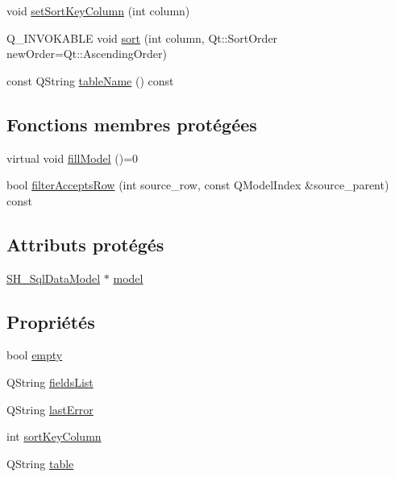 \begin{DoxyCompactItemize}
\item 
void \hyperlink{classSimpleHotel_1_1SH__ExtendedProxyModel_a901f2d931216126e6769482d91f02fa0}{set\-Sort\-Key\-Column} (int column)
\item 
Q\-\_\-\-I\-N\-V\-O\-K\-A\-B\-L\-E void \hyperlink{classSimpleHotel_1_1SH__ExtendedProxyModel_a5d7686a9fae295e0662057b8450c8a8d}{sort} (int column, Qt\-::\-Sort\-Order new\-Order=Qt\-::\-Ascending\-Order)
\item 
const Q\-String \hyperlink{classSimpleHotel_1_1SH__ExtendedProxyModel_a49617ea8bab745425beec3dbd3fddba7}{table\-Name} () const 
\end{DoxyCompactItemize}
\subsection*{Fonctions membres protégées}
\begin{DoxyCompactItemize}
\item 
virtual void \hyperlink{classSimpleHotel_1_1SH__ExtendedProxyModel_a3538dabe2b3cf71a0a85159ea95469dd}{fill\-Model} ()=0
\item 
bool \hyperlink{classSimpleHotel_1_1SH__ExtendedProxyModel_a11b30f0f630fe9ddaa778eb9534918e1}{filter\-Accepts\-Row} (int source\-\_\-row, const Q\-Model\-Index \&source\-\_\-parent) const 
\end{DoxyCompactItemize}
\subsection*{Attributs protégés}
\begin{DoxyCompactItemize}
\item 
\hyperlink{classSimpleHotel_1_1SH__SqlDataModel}{S\-H\-\_\-\-Sql\-Data\-Model} $\ast$ \hyperlink{classSimpleHotel_1_1SH__ExtendedProxyModel_ad31718ed4f13ecafcb53dbf1e392b3b0}{model}
\end{DoxyCompactItemize}
\subsection*{Propriétés}
\begin{DoxyCompactItemize}
\item 
bool \hyperlink{classSimpleHotel_1_1SH__ExtendedProxyModel_a45f47ab859c5443353977e22417de357}{empty}
\item 
Q\-String \hyperlink{classSimpleHotel_1_1SH__ExtendedProxyModel_a8872cff3d50bf25b1673ed2c951eeb4a}{fields\-List}
\item 
Q\-String \hyperlink{classSimpleHotel_1_1SH__ExtendedProxyModel_a8b5c74b23d91bde591eba6d32a20c30f}{last\-Error}
\item 
int \hyperlink{classSimpleHotel_1_1SH__ExtendedProxyModel_a879989e7ae305dc2794b281c5e0ab689}{sort\-Key\-Column}
\item 
Q\-String \hyperlink{classSimpleHotel_1_1SH__ExtendedProxyModel_a98cd3050230163561b4dac11a9675b8e}{table}
\end{DoxyCompactItemize}
